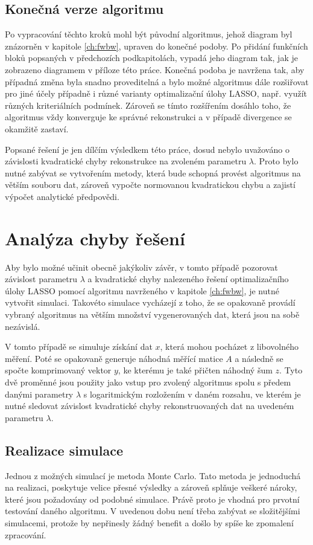 \documentclass[FM,BP]{tulthesis}
\begin{document}
\section{Konečná verze algoritmu}
\label{subch:finalAlg}
Po vypracování těchto kroků mohl být původní algoritmus, jehož diagram byl znázorněn v kapitole \ref{ch:fwbw}, upraven do konečné podoby. Po přidání funkčních bloků popsaných v předchozích podkapitolách, vypadá jeho diagram tak, jak je zobrazeno diagramem v příloze této práce. Konečná podoba je navržena tak, aby případná změna byla snadno proveditelná a bylo možné algoritmus dále rozšiřovat pro jiné účely případně i různé varianty optimalizační úlohy LASSO, např. využít různých kriteriálních podmínek. Zároveň se tímto rozšířením dosáhlo toho, že algoritmus vždy konverguje ke správné rekonstrukci a v případě divergence se okamžitě zastaví. 

Popsané řešení je jen dílčím výsledkem této práce, dosud nebylo uvažováno o závislosti kvadratické chyby rekonstrukce na zvoleném parametru $\lambda$. Proto bylo nutné zabývat se vytvořením metody, která bude schopná provést algoritmus na větším souboru dat, zároveň vypočte normovanou kvadratickou chybu a zajistí výpočet analytické předpovědi.

\chapter{Analýza chyby řešení}
\label{ch:simulace}
Aby bylo možné učinit obecně jakýkoliv závěr, v tomto případě pozorovat závislost parametru $\lambda$ a kvadratické chyby nalezeného řešení optimalizačního úlohy LASSO pomocí algoritmu navrženého v kapitole \ref{ch:fwbw}, je nutné vytvořit simulaci. Takovéto simulace vycházejí z toho, že se opakovaně provádí vybraný algoritmus na větším množství vygenerovaných dat, která jsou na sobě nezávislá.

V tomto případě se simuluje získání dat $x$, která mohou pocházet z libovolného měření. Poté se opakovaně generuje náhodná měřící matice $A$ a následně se spočte komprimovaný vektor $y$, ke kterému je také přičten náhodný šum $z$. Tyto dvě proměnné jsou použity jako vstup pro zvolený algoritmus spolu s předem danými parametry $\lambda$ s logaritmickým rozložením v daném rozsahu, ve kterém je nutné sledovat závislost kvadratické chyby rekonstruovaných dat na uvedeném parametru $\lambda$.

\section{Realizace simulace}
\label{subch:sim}
Jednou z možných simulací je metoda Monte Carlo. Tato metoda je jednoduchá na realizaci, poskytuje velice přesné výsledky a zároveň splňuje veškeré nároky, které jsou požadovány od podobné simulace. Právě proto je vhodná pro prvotní testování daného algoritmu. V uvedenou dobu není třeba zabývat se složitějšími simulacemi, protože by nepřinesly žádný benefit a došlo by spíše ke zpomalení zpracování. 
\end{document}
